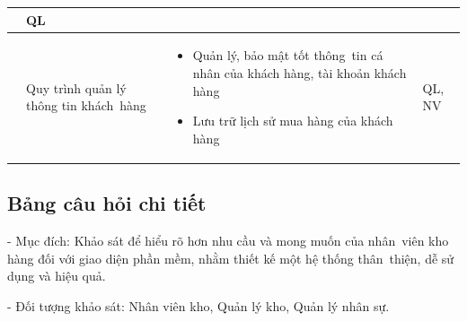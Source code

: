 \documentclass[a4paper,12pt]{report}
\begin{document}
\begin{center}
\begin{longtable}{|>{\centering\arraybackslash}c|
        >{\centering\arraybackslash}p{4cm}|
        >{\centering\arraybackslash}p{6.5cm}|
        >{\centering\arraybackslash}p{4cm}|}
\begin{itemize}
        \end{itemize}       & QL                                                 \\
        \hline
        7                                                                                 & Quy trình quản lý thông tin khách~hàng
                                                                                          &
        \begin{itemize}
            \item Quản lý, bảo mật tốt thông~tin cá nhân của khách hàng, tài khoản khách hàng
            \item Lưu trữ lịch sử mua hàng của khách hàng
        \end{itemize} & QL, NV                                           \\
        \hline
    \end{longtable}
\end{center}

\subsection{Bảng câu hỏi chi tiết}
- Mục đích: Khảo sát để hiểu rõ hơn nhu cầu và mong muốn của nhân~viên kho hàng đối với giao diện phần mềm, nhằm thiết kế một hệ thống thân~thiện, dễ sử dụng và hiệu quả.

\vspace{0.8em}

- Đối tượng khảo sát: Nhân viên kho, Quản lý kho, Quản lý nhân sự.
\end{document}
